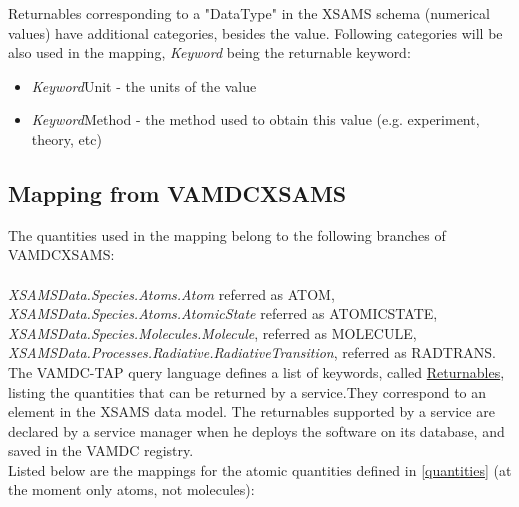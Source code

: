 \documentclass[11pt,a4paper]{ivoa}
\begin{document}
Returnables corresponding to a "DataType" in the XSAMS schema (numerical values) have additional categories, besides the value. Following categories will be also used in the mapping, \textit{Keyword} being the returnable keyword:

 \begin{itemize}
\item \textit{Keyword}Unit  - the units of the value
\item \textit{Keyword}Method - the method used to obtain this value (e.g. experiment, theory, etc)
\end{itemize}


\subsection{Mapping from VAMDCXSAMS}

The quantities used in the mapping belong to the following branches of VAMDCXSAMS:\\\\
\textit{XSAMSData.Species.Atoms.Atom}  referred as ATOM,\\
\textit{XSAMSData.Species.Atoms.AtomicState}  referred as ATOMICSTATE,\\
\textit{XSAMSData.Species.Molecules.Molecule}, referred as MOLECULE,\\
\textit{XSAMSData.Processes.Radiative.RadiativeTransition}, referred as RADTRANS.\\

The VAMDC-TAP query language defines a list of keywords, called \href{https://standards.vamdc.eu/dictionary/returnables.html}{Returnables}, listing the quantities that can be returned by a service.They correspond to an element in the XSAMS data model. The returnables supported by a service are declared by a service manager when he deploys the software on its database, and saved in the VAMDC registry. \\

Listed below are the mappings for the atomic quantities defined in \ref{quantities} (at the moment only atoms, not molecules):
\end{document}
